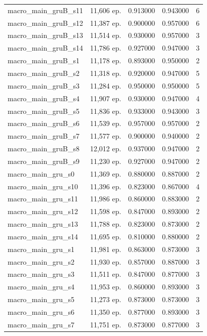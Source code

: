 \begin{tabular}{llrrr}
macro\_main\_gruB\_s11 & 11,606 ep. & 0.913000 & 0.943000 & 6 \\
macro\_main\_gruB\_s12 & 11,387 ep. & 0.900000 & 0.957000 & 6 \\
macro\_main\_gruB\_s13 & 11,514 ep. & 0.930000 & 0.957000 & 3 \\
macro\_main\_gruB\_s14 & 11,786 ep. & 0.927000 & 0.947000 & 3 \\
macro\_main\_gruB\_s1 & 11,178 ep. & 0.893000 & 0.950000 & 2 \\
macro\_main\_gruB\_s2 & 11,318 ep. & 0.920000 & 0.947000 & 5 \\
macro\_main\_gruB\_s3 & 11,284 ep. & 0.950000 & 0.950000 & 5 \\
macro\_main\_gruB\_s4 & 11,907 ep. & 0.930000 & 0.947000 & 4 \\
macro\_main\_gruB\_s5 & 11,836 ep. & 0.933000 & 0.943000 & 3 \\
macro\_main\_gruB\_s6 & 11,539 ep. & 0.957000 & 0.957000 & 2 \\
macro\_main\_gruB\_s7 & 11,577 ep. & 0.900000 & 0.940000 & 2 \\
macro\_main\_gruB\_s8 & 12,012 ep. & 0.937000 & 0.947000 & 2 \\
macro\_main\_gruB\_s9 & 11,230 ep. & 0.927000 & 0.947000 & 2 \\
macro\_main\_gru\_s0 & 11,369 ep. & 0.880000 & 0.887000 & 2 \\
macro\_main\_gru\_s10 & 11,396 ep. & 0.823000 & 0.867000 & 4 \\
macro\_main\_gru\_s11 & 11,986 ep. & 0.860000 & 0.883000 & 2 \\
macro\_main\_gru\_s12 & 11,598 ep. & 0.847000 & 0.893000 & 2 \\
macro\_main\_gru\_s13 & 11,788 ep. & 0.823000 & 0.873000 & 2 \\
macro\_main\_gru\_s14 & 11,695 ep. & 0.810000 & 0.880000 & 2 \\
macro\_main\_gru\_s1 & 11,981 ep. & 0.863000 & 0.873000 & 3 \\
macro\_main\_gru\_s2 & 11,930 ep. & 0.857000 & 0.887000 & 3 \\
macro\_main\_gru\_s3 & 11,511 ep. & 0.847000 & 0.877000 & 3 \\
macro\_main\_gru\_s4 & 11,953 ep. & 0.860000 & 0.893000 & 3 \\
macro\_main\_gru\_s5 & 11,273 ep. & 0.873000 & 0.873000 & 3 \\
macro\_main\_gru\_s6 & 11,350 ep. & 0.877000 & 0.893000 & 3 \\
macro\_main\_gru\_s7 & 11,751 ep. & 0.873000 & 0.877000 & 3 \\

\end{tabular}
